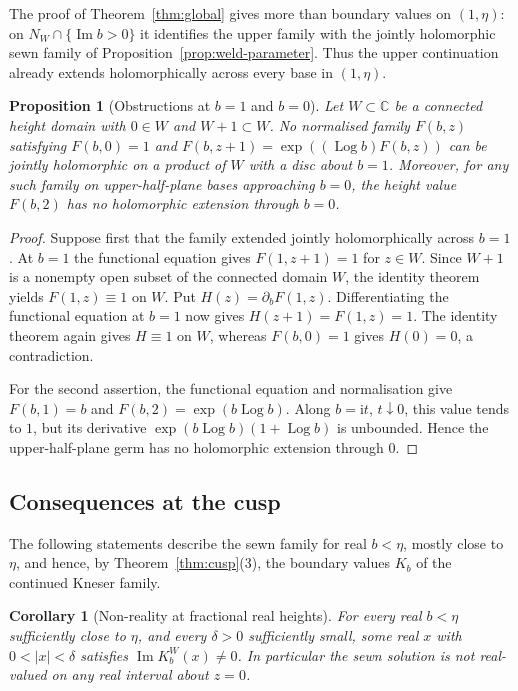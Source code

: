 \documentclass[11pt]{amsart}
\newtheorem{proposition}[theorem]{Proposition}
\newtheorem{corollary}[theorem]{Corollary}
\theoremstyle{definition}
\newcommand{\Kk}{K}
\newcommand{\ii}{\mathrm{i}}
\begin{document}
The proof of Theorem~\ref{thm:global} gives more than boundary values on
$(1,\eta)$: on $N_W\cap\{\operatorname{Im}b>0\}$ it identifies the upper family
with the jointly holomorphic sewn family of
Proposition~\ref{prop:weld-parameter}.  Thus the upper continuation already
extends holomorphically across every base in $(1,\eta)$.

\begin{proposition}[Obstructions at $b=1$ and $b=0$]\label{prop:zero-one-obstruction}
Let $W\subset\mathbb C$ be a connected height domain with $0\in W$ and
$W+1\subset W$.  No normalised family $F(b,z)$ satisfying
$F(b,0)=1$ and $F(b,z+1)=\exp((\operatorname{Log}b)F(b,z))$
can be jointly holomorphic on a product of $W$ with a disc about $b=1$.
Moreover, for any such family on upper-half-plane bases approaching $b=0$,
the height value $F(b,2)$ has no holomorphic extension through $b=0$.
\end{proposition}

\begin{proof}
Suppose first that the family extended jointly holomorphically across
$b=1$.  At $b=1$ the functional equation gives $F(1,z+1)=1$ for
$z\in W$.  Since $W+1$ is a nonempty open subset of the connected domain
$W$, the identity theorem yields $F(1,z)\equiv1$ on $W$.
Put $H(z)=\partial_bF(1,z)$.  Differentiating the functional equation at
$b=1$ now gives $H(z+1)=F(1,z)=1$.  The identity theorem again gives
$H\equiv1$ on $W$, whereas $F(b,0)=1$ gives $H(0)=0$, a contradiction.

For the second assertion, the functional equation and normalisation give
$F(b,1)=b$ and $F(b,2)=\exp(b\operatorname{Log}b)$.
Along $b=\ii t$, $t\downarrow0$, this value tends to $1$, but its
derivative $\exp(b\operatorname{Log}b)(1+\operatorname{Log}b)$ is unbounded.
Hence the upper-half-plane germ has no holomorphic extension through $0$.
\end{proof}

\subsection{Consequences at the cusp}
The following statements describe the sewn family for real $b<\eta$, mostly
close to $\eta$, and hence, by Theorem~\ref{thm:cusp}(3), the boundary values
$\Kk_b$ of the continued Kneser family.
\begin{corollary}[Non-reality at fractional real heights]
\label{cor:sewn-nonreal}
For every real $b<\eta$ sufficiently close to $\eta$, and every
$\delta>0$ sufficiently small, some real $x$ with $0<|x|<\delta$
satisfies $\operatorname{Im}\Kk_b^W(x)\ne0$.  In particular the sewn
solution is not real-valued on any real interval about $z=0$.
\end{corollary}
\end{document}
